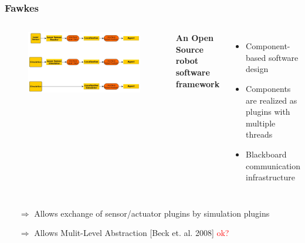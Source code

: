 \documentclass[]{beamer}
\begin{document}
\begin{frame}
  \frametitle{Fawkes}
  \begin{columns}
    \begin{figure}
      \includegraphics[width=\textwidth]{../tabs/mla_complete.jpg}
    \end{figure}
    \textbf{\large An Open Source robot software framework}
    \begin{itemize}
    \item Component-based software design
    \item Components are realized as plugins with multiple threads
    \item Blackboard communication infrastructure
      \pause
    \end{itemize}
  \end{columns}
  \begin{itemize}
  \item[$\Rightarrow$] Allows exchange of sensor/actuator plugins by simulation plugins
  \item[$\Rightarrow$] Allows Mulit-Level Abstraction [Beck et. al. 2008] \textcolor{red}{ok?}
  \end{itemize}
\end{frame}
\end{document}
